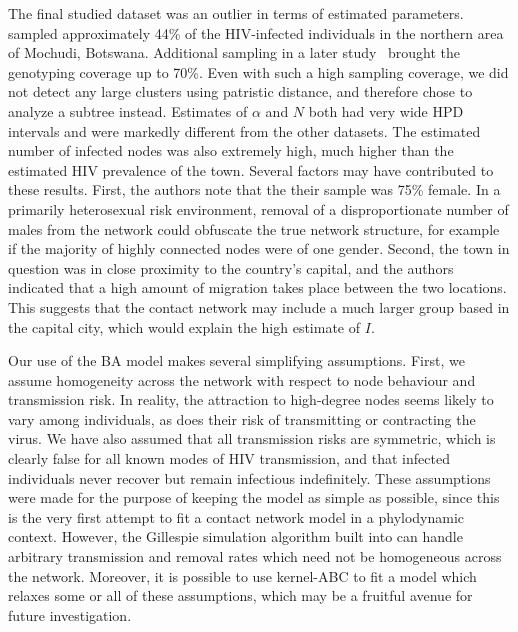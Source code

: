 The final studied dataset was an outlier in terms of estimated parameters.
\textcite{novitsky2013phylogenetic} sampled approximately 44\% of the
HIV-infected individuals in the northern area of Mochudi, Botswana. Additional
sampling in a later study~\autocite{novitsky2014impact} brought the genotyping
coverage up to 70\%. Even with such a high sampling coverage, we did not detect
any large clusters using patristic distance, and therefore chose to analyze a
subtree instead. Estimates of $\alpha$ and $N$ both had very wide HPD intervals
and were markedly different from the other datasets. The estimated number of
infected nodes was also extremely high, much higher than the estimated HIV
prevalence of the town. Several factors may have contributed to these results.
First, the authors note that the their sample was 75\% female.  In a primarily
heterosexual risk environment, removal of a disproportionate number of males
from the network could obfuscate the true network structure, for example if the
majority of highly connected nodes were of one gender.  Second, the town in
question was in close proximity to the country's capital, and the authors
indicated that a high amount of migration takes place between the two
locations. This suggests that the contact network may include a much larger
group based in the capital city, which would explain the high estimate of $I$.

Our use of the \gls{BA} model makes several simplifying assumptions. First, we
assume homogeneity across the network with respect to node behaviour and
transmission risk. In reality, the attraction to high-degree nodes seems likely
to vary among individuals, as does their risk of transmitting or contracting
the virus. We have also assumed that all transmission risks are symmetric,
which is clearly false for all known modes of \gls{HIV} transmission, and that
infected individuals never recover but remain infectious indefinitely. These
assumptions were made for the purpose of keeping the model as simple as
possible, since this is the very first attempt to fit a contact network model
in a phylodynamic context. However, the Gillespie simulation algorithm built
into  can handle arbitrary transmission and removal rates
which need not be homogeneous across the network. Moreover, it is possible to
use kernel-\gls{ABC} to fit a model which relaxes some or all of these
assumptions, which may be a fruitful avenue for future investigation.
